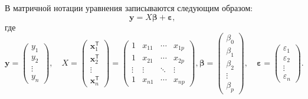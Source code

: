 В матричной нотации уравнения записываются следующим образом:
\begin{equation}
\label{eq:matrix_linreg}
\mathbf{y}=X{\boldsymbol{\beta}} + {\boldsymbol{\varepsilon}},\,
\end{equation}
где
\begin{equation}
\label{eq:matrix_linreg_vectors}
\mathbf{y} = {\begin{pmatrix} y_{1} \\ y_{2} \\\vdots \\ y_{n} \end {pmatrix}}, \quad X = {\begin{pmatrix} \mathbf{x}_{1}^{\mathsf{T}} \\\mathbf{x}_{2}^{\mathsf{T}} \\\vdots \\\mathbf{x}_{n}^{\mathsf{T}} \end{pmatrix}} = {\begin{pmatrix} 1 & x_{11} & \cdots & x_{1p} \\ 1 & x_{21} & \cdots & x_{2p} \\\vdots & \vdots & \ddots & \vdots \\ 1 & x_{n1} & \cdots & x_{np} \end{pmatrix}},
{\boldsymbol{\beta}} = {\begin{pmatrix} \beta_{0} \\\beta_{1} \\\beta_{2} \\\vdots \\\beta_{p} \end{pmatrix}}, \quad {\boldsymbol{\varepsilon}} = {\begin{pmatrix} \varepsilon_{1} \\\varepsilon_{2} \\\vdots \\\varepsilon_{n} \end{pmatrix}}.
\end{equation}

